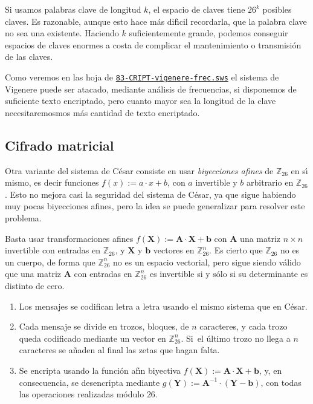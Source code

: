  Si usamos palabras clave de longitud $k$, el espacio de claves tiene $26^k$
posibles claves. Es razonable, aunque esto hace m\'as
dif\'{\i}cil recordarla,  que la palabra clave no sea una existente. Haciendo
$k$ suficientemente grande, podemos conseguir espacios de claves enormes a costa
de complicar el mantenimiento o transmisi\'on de las claves. 

Como veremos en las hoja de {\sage}
\href{http://sage.mat.uam.es:8888/home/pub/??/}{\tt 83-CRIPT-vigenere-frec.sws}
el sistema de  Vigenere puede ser atacado, mediante an\'alisis de frecuencias, 
si disponemos de suficiente texto encriptado, pero cuanto  mayor sea la 
longitud 
de la clave 
necesitaremosmos m\'as cantidad de texto encriptado.

\subsection{Cifrado matricial}


Otra variante del sistema de C\'esar consiste en usar {\itshape biyecciones
afines} de $\mathbb{Z}_{26}$ en s\'{\i} mismo, es decir funciones $f(x):=a\cdot
x +b$, con $a$ invertible y $b$ arbitrario en $\mathbb{Z}_{26}$.  Esto no mejora
casi la seguridad del sistema de C\'esar, ya que sigue habiendo muy pocas
biyecciones afines, pero la idea se puede generalizar para resolver este
problema. 

Basta usar transformaciones afines $f(\mathbf{X}):=\mathbf{A}\cdot
\mathbf{X} +\mathbf{b}$ con $\mathbf{A}$ una matriz $n\times n$ invertible con
entradas en $\mathbb{Z}_{26}$, y $\mathbf{X}$ y $\mathbf{b}$ vectores en
$\mathbb{Z}_{26}^n$. Es cierto que $\mathbb{Z}_{26}$ no es un cuerpo, de forma 
que
$\mathbb{Z}_{26}^n$ no es un espacio vectorial, pero sigue siendo v\'alido que 
una
matriz $\mathbf{A}$ con entradas en 
 $\mathbb{Z}_{26}^n$ es invertible si y s\'olo si su determinante es distinto de
cero.

\begin{enumerate}
 \item Los mensajes se codifican letra a letra usando el mismo sistema que en
C\'esar.
 \item Cada mensaje se divide en trozos, bloques,  de $n$ caracteres, y cada
trozo queda codificado mediante un vector en $\mathbb{Z}_{26}^n$. Si~el \'ultimo
trozo no llega a $n$ caracteres se a\~naden al final las zetas que hagan falta.

\item Se encripta usando la funci\'on af\'{\i}n biyectiva
$f(\mathbf{X}):=\mathbf{A}\cdot
\mathbf{X} +\mathbf{b}$, y, en consecuencia, se desencripta mediante
$g(\mathbf{Y}):=\mathbf{A}^{-1}\cdot(
\mathbf{Y} -\mathbf{b})$, con todas las operaciones realizadas m\'odulo $26$.
 \end{enumerate}

